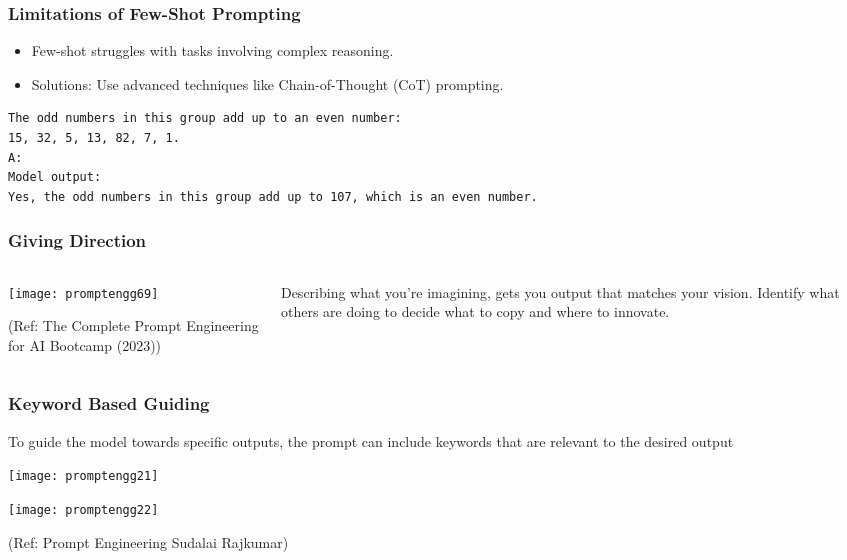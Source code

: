 \begin{frame}[fragile]\frametitle{Limitations of Few-Shot Prompting}
    \begin{itemize}
        \item Few-shot struggles with tasks involving complex reasoning.
        \item Solutions: Use advanced techniques like Chain-of-Thought (CoT) prompting.
    \end{itemize}
	
        \begin{lstlisting}[language=HTML]
The odd numbers in this group add up to an even number: 
15, 32, 5, 13, 82, 7, 1. 
A:
Model output:
Yes, the odd numbers in this group add up to 107, which is an even number.
        \end{lstlisting}

\end{frame}


\begin{frame}[fragile]\frametitle{Giving Direction}

\begin{columns}
    \begin{column}[T]{0.6\linewidth}
		\begin{center}
		\texttt{[image: promptengg69]}

		{\tiny (Ref: The Complete Prompt Engineering for AI Bootcamp (2023))}
		\end{center}	
    \end{column}
    \begin{column}[T]{0.4\linewidth}
		Describing what you’re imagining, gets you output that matches your vision.
		Identify what others are doing to decide what to copy and where to innovate.
    \end{column}
  \end{columns}
\end{frame}

\begin{frame}[fragile]\frametitle{ Keyword Based Guiding}

To guide the model towards specific outputs, the prompt can include 
keywords that are relevant to the desired output

\begin{center}
\texttt{[image: promptengg21]}

\texttt{[image: promptengg22]}

{\tiny (Ref: Prompt Engineering Sudalai Rajkumar)}

\end{center}		
	
\end{frame}

